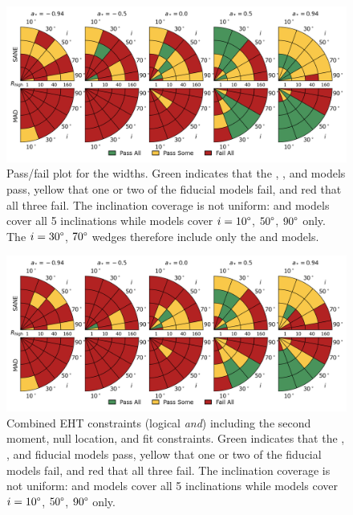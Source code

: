 
\begin{figure}
 \centering
 \includegraphics[width=\textwidth]{./figures/Mring_w_Constraints.png}
  \caption{Pass/fail plot for the \mring widths.
    Green indicates that the \kharma, \bhac, and \hamr models pass, yellow that one or two of the fiducial models fail, and red that all three fail.
    The inclination coverage is not uniform: \bhac and \kharma models cover all 5 inclinations while \hamr models cover $i = 10\degree$, $50\degree$, $90\degree$ only.
    The $i = 30\degree$, $70\degree$ wedges therefore include only the \bhac and \kharma models.}
  \label{fig:mring_width_salsa} %
\end{figure}

\begin{figure}
  \centering
  \includegraphics[width=\textwidth]{./figures/Interferometric_Constraints.png}
  \caption{Combined EHT constraints (logical {\em and}) including the second moment, null location, and \mring fit constraints.
    Green indicates that the \kharma, \bhac, and \hamr fiducial models pass, yellow that one or two of the fiducial models fail, and red that all three fail.
    The inclination coverage is not uniform: \bhac and \kharma models cover all 5 inclinations while \hamr models cover $i = 10\degree$, $50\degree$, $90\degree$ only.}
  \label{fig:all_EHT_constraints} %
\end{figure}

